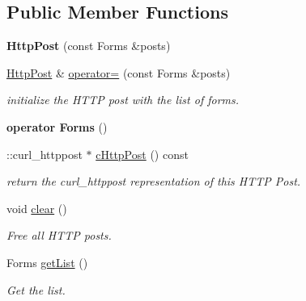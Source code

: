 \subsection*{Public Member Functions}
\begin{DoxyCompactItemize}
\item 
\hypertarget{classcurlpp_1_1HttpPost_a77c1bd73fe664fa9b5bc004a3ccba2c1}{{\bfseries Http\-Post} (const Forms \&posts)}\label{classcurlpp_1_1HttpPost_a77c1bd73fe664fa9b5bc004a3ccba2c1}

\item 
\hyperlink{classcurlpp_1_1HttpPost}{Http\-Post} \& \hyperlink{classcurlpp_1_1HttpPost_a87ce1f2b173a97b2e1aae8b0ed89dcfb}{operator=} (const Forms \&posts)
\begin{DoxyCompactList}\small\item\em initialize the H\-T\-T\-P post with the list of forms. \end{DoxyCompactList}\item 
\hypertarget{classcurlpp_1_1HttpPost_ab2d9e2991e8afd6b4579fdc887c8bd04}{{\bfseries operator Forms} ()}\label{classcurlpp_1_1HttpPost_ab2d9e2991e8afd6b4579fdc887c8bd04}

\item 
\-::curl\-\_\-httppost $\ast$ \hyperlink{classcurlpp_1_1HttpPost_addd3603b92cd76e65fffa2d14455e00a}{c\-Http\-Post} () const 
\begin{DoxyCompactList}\small\item\em return the curl\-\_\-httppost representation of this H\-T\-T\-P Post. \end{DoxyCompactList}\item 
\hypertarget{classcurlpp_1_1HttpPost_ade291ea8719d0be0b063941eaa5cd0d0}{void \hyperlink{classcurlpp_1_1HttpPost_ade291ea8719d0be0b063941eaa5cd0d0}{clear} ()}\label{classcurlpp_1_1HttpPost_ade291ea8719d0be0b063941eaa5cd0d0}

\begin{DoxyCompactList}\small\item\em Free all H\-T\-T\-P posts. \end{DoxyCompactList}\item 
\hypertarget{classcurlpp_1_1HttpPost_ac474eb2164a5c56d8d9f9d22da38b6f5}{Forms \hyperlink{classcurlpp_1_1HttpPost_ac474eb2164a5c56d8d9f9d22da38b6f5}{get\-List} ()}\label{classcurlpp_1_1HttpPost_ac474eb2164a5c56d8d9f9d22da38b6f5}

\begin{DoxyCompactList}\small\item\em Get the list. \end{DoxyCompactList}\end{DoxyCompactItemize}


